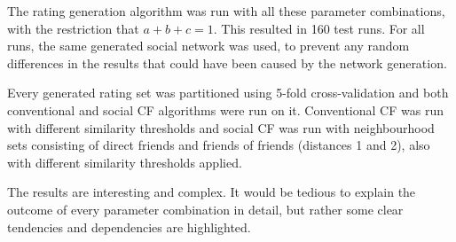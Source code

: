 The rating generation algorithm was run with all these parameter combinations, with the restriction that $a+b+c=1$. This resulted in 160 test runs. For all runs, the same generated social network was used, to prevent any random differences in the results that could have been caused by the network generation.

Every generated rating set was partitioned using 5-fold cross-validation and both conventional and social CF algorithms were run on it. Conventional CF was run with different similarity thresholds and social CF was run with neighbourhood sets consisting of direct friends and friends of friends (distances 1 and 2), also with different similarity thresholds applied.
\newline

The results are interesting and complex. It would be tedious to explain the outcome of every parameter combination in detail, but rather some clear tendencies and dependencies are highlighted.

